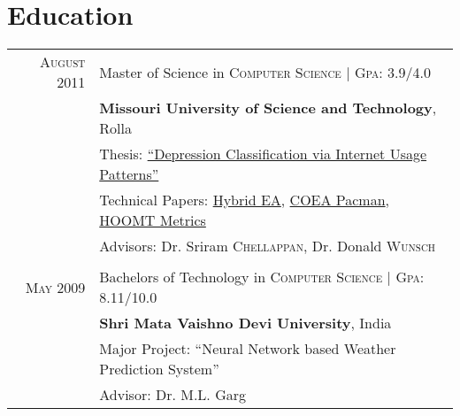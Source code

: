 \documentclass[a4paper,11pt]{article}
\begin{document}
\section{Education}
\begin{tabularx}{0.95\textwidth}{rX}	
  \textsc{August} 2011 & Master of Science in \textsc{Computer Science} | \normalsize \textsc{Gpa}: 3.9/4.0 \\
& \normalsize \textbf{Missouri University of Science and Technology}, Rolla \\
& Thesis: \href{https://github.com/raghakot/papers/blob/master/thesis.pdf}{``Depression Classification via Internet Usage Patterns''} \\
& Technical Papers: \href{https://github.com/raghakot/papers/blob/master/SPSS.pdf}{Hybrid EA}, \href{https://github.com/raghakot/papers/blob/master/coea_pacman.pdf}{COEA Pacman}, \href{https://github.com/raghakot/papers/blob/master/hoomt_metrics.pdf}{HOOMT Metrics} \\
& \small Advisors: Dr. Sriram \textsc{Chellappan}, Dr. Donald \textsc{Wunsch}\\
& \\
  \textsc{May} 2009 & Bachelors of Technology in \textsc{Computer Science} | \normalsize \textsc{Gpa}: 8.11/10.0 \\
& \normalsize \textbf{Shri Mata Vaishno Devi University}, India \\
& Major Project: ``Neural Network based Weather Prediction System'' \\
& \small Advisor: Dr. M.L. Garg \\
\end{tabularx}
\
\end{document}
